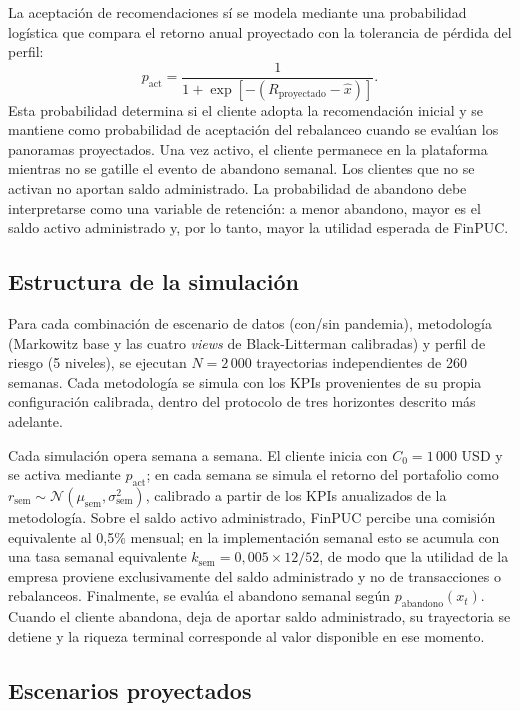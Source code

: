 La aceptaci\'on de recomendaciones s\'i se modela mediante una probabilidad
log\'istica que compara el retorno anual proyectado con la tolerancia de p\'erdida
del perfil:
\begin{equation}
p_{\text{act}} =
\frac{1}{1+\exp[-(R_{\text{proyectado}}-\hat{x})]}.
\end{equation}
Esta probabilidad determina si el cliente adopta la recomendaci\'on inicial y se
mantiene como probabilidad de aceptaci\'on del rebalanceo cuando se eval\'uan los
panoramas proyectados. Una vez activo, el cliente permanece en la plataforma
mientras no se gatille el evento de abandono semanal. Los clientes que no se
activan no aportan saldo administrado. La probabilidad de abandono debe
interpretarse como una variable de retenci\'on: a menor abandono, mayor es el
saldo activo administrado y, por lo tanto, mayor la utilidad esperada de FinPUC.

\subsection{Estructura de la simulaci\'on}

Para cada combinaci\'on de escenario de datos (con/sin pandemia), metodolog\'ia
(Markowitz base y las cuatro \textit{views} de Black-Litterman calibradas) y
perfil de riesgo (5 niveles), se ejecutan $N = 2\,000$ trayectorias
independientes de 260 semanas. Cada metodolog\'ia se simula con los KPIs
provenientes de su propia configuraci\'on calibrada, dentro del protocolo de
tres horizontes descrito m\'as adelante.

Cada simulaci\'on opera semana a semana. El cliente inicia con
$C_0 = 1\,000$ USD y se activa mediante $p_{\text{act}}$; en cada semana se
simula el retorno del portafolio como $r_{\text{sem}} \sim
\mathcal{N}(\mu_{\text{sem}}, \sigma_{\text{sem}}^2)$, calibrado a partir de los
KPIs anualizados de la metodolog\'ia. Sobre el saldo activo administrado, FinPUC
percibe una comisi\'on equivalente al 0,5\% mensual; en la implementaci\'on
semanal esto se acumula con una tasa semanal equivalente
$k_{\text{sem}} = 0{,}005 \times 12/52$, de modo que la utilidad de la empresa
proviene exclusivamente del saldo administrado y no de transacciones o
rebalanceos. Finalmente, se eval\'ua el abandono semanal seg\'un
$p_{\text{abandono}}(x_t)$. Cuando el cliente abandona, deja de aportar saldo
administrado, su trayectoria se detiene y la riqueza terminal corresponde al
valor disponible en ese momento.


\subsection{Escenarios proyectados}

